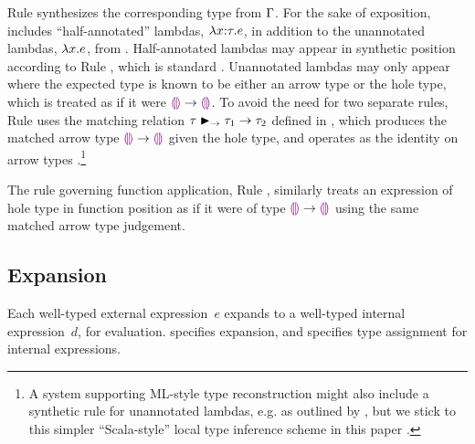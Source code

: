 Rule  synthesizes the corresponding type from $\Gamma$. 
For the sake of exposition, \HazelnutLive includes ``half-annotated'' lambdas, $\lambda x{:}\tau.e$, in addition to the unannotated lambdas, $\lambda x.e$, from \Hazelnut.
%
Half-annotated lambdas may appear in synthetic position according to Rule , which is standard \cite{Chlipala:2005da}.
%
Unannotated lambdas may only appear where the expected type is known to be either an arrow type or the hole type, which is treated as if it were $\textcolor{violet}{\llparenthesis}\textcolor{violet}{\rrparenthesis} \rightarrow \textcolor{violet}{\llparenthesis}\textcolor{violet}{\rrparenthesis}$.
%
To avoid the need for two separate rules, Rule  uses the matching relation $\tau \blacktriangleright_{\rightarrow} \tau_1 \rightarrow \tau_2$ defined in , which produces the matched arrow type $\textcolor{violet}{\llparenthesis}\textcolor{violet}{\rrparenthesis} \rightarrow \textcolor{violet}{\llparenthesis}\textcolor{violet}{\rrparenthesis}$ given the hole type, and operates as the identity on arrow types \cite{DBLP:conf/snapl/SiekVCB15,DBLP:conf/popl/GarciaC15}.\footnote{A system supporting ML-style type reconstruction \cite{damas1982principal} might also include a synthetic rule for unannotated lambdas, e.g. as outlined by \citet{DBLP:conf/icfp/DunfieldK13}, but we stick to this simpler ``Scala-style'' local type inference scheme in this paper \cite{Pierce:2000ve,Odersky:2001lb}.}
%
%
%
%

The rule governing function application, Rule , similarly treats an expression of hole type in function position as if it were of type $\textcolor{violet}{\llparenthesis}\textcolor{violet}{\rrparenthesis} \rightarrow \textcolor{violet}{\llparenthesis}\textcolor{violet}{\rrparenthesis}$ using the same matched arrow type judgement.

\vspace{-4px}
\subsection{Expansion}
\label{sec:expansion}
\vspace{-1px}




Each well-typed external expression~$e$ expands to a well-typed internal expression~$d$, for evaluation.
%
 specifies expansion, and  specifies type assignment for internal expressions.
%

